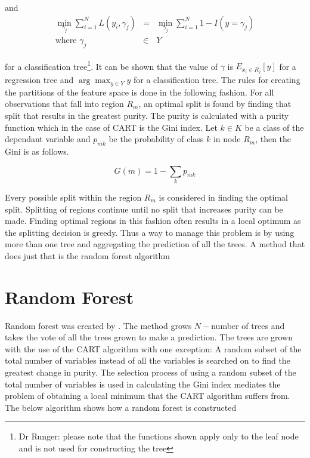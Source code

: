 \documentclass[twoside,11pt]{article}
\begin{document}
and 
\begin{equation}
	\begin{array}{rcl}
		 \min_{\gamma_j} \sum_{i=1}^N L(y_i,\gamma_j) & = &  \min_{\gamma_j} \sum_{i=1}^N 1-I(y=\gamma_j) \\
	\mbox{where }	\gamma_j &\in & Y
	\end{array}
\end{equation}

 
for a classification tree\footnote{Dr Runger: please note that the functions shown apply only to the leaf node and is not used for constructing the tree}. It can be shown that the value of $\gamma$ is $E_{x_i \in R_j}[y]$ for a regression tree and $\arg\max_{y\in Y} y$ for a classification tree. The rules for creating the partitions of the feature space is done in the following fashion. For all observations that fall into region $R_m$, an optimal split is found by finding that split that results in the greatest purity. The purity is calculated with a purity function which in the case of CART is the Gini index. Let $k \in K$ be a class of the dependant variable and $p_{mk}$ be the probability of class $k$ in node $R_m$, then the Gini is as follows.

\begin{equation}
	G(m)= 1-\displaystyle\sum_k p_{mk}
\end{equation}

Every possible split within the region $R_m$ is considered in finding the optimal split. Splitting of regions continue until no split that increases purity can be made. Finding optimal regions in this fashion often results in a local optimum as the splitting decision is greedy. Thus a way to manage this problem is by using more than one tree and aggregating the prediction of all the trees. A method that does just that is the random forest algorithm

\section{Random Forest}
Random forest was created by \citet{Breiman01}. The method grows $N-$number of trees and takes the vote of all the trees grown to make a prediction. The trees are grown with the use of the CART algorithm with one exception: A random subset of the total number of variables instead of all the variables is searched on to find the greatest change in purity. The selection process of using a random subset of the total number of variables is used in calculating the Gini index mediates the problem of obtaining a local minimum that the CART algorithm suffers from. The below algorithm shows how a random forest is constructed
\end{document}
